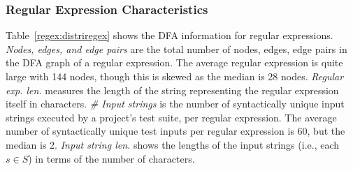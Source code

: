  

\subsubsection{Regular Expression Characteristics}
Table~\ref{regex:distriregex} shows the DFA information for regular expressions. \emph{Nodes, edges, and edge pairs} are the total number of nodes, edges, edge pairs in the DFA graph of a regular expression. The average regular expression is quite large with 144 nodes, though this is skewed as the median is 28 nodes. 
\emph{Regular exp. len.} measures the length of the string representing the regular expression itself in characters. 
\emph{\# Input strings} is the number of syntactically unique input strings executed by a project's test suite, per regular expression. 
The average number of syntactically unique test inputs per regular expression is 60, but the median is 2. %
 \emph{Input string len.} shows the lengths of the input strings (i.e., each $s \in S$) in terms of the number of characters. %




